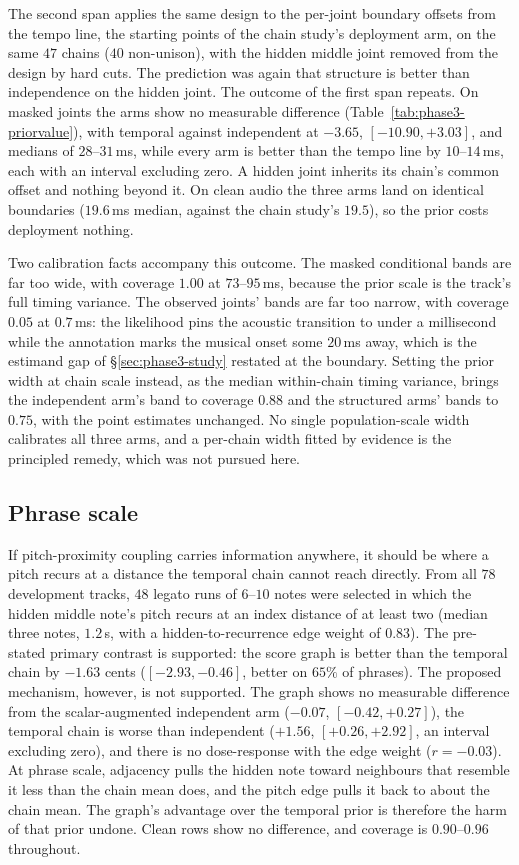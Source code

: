 The second span applies the same design to the per-joint boundary offsets
from the tempo line, the starting points of the chain study's deployment
arm, on the same $47$ chains ($40$ non-unison), with the hidden middle joint
removed from the design by hard cuts. The prediction was again that
structure is better than independence on the hidden joint. The outcome of
the first span repeats. On masked joints the arms show no measurable
difference (Table~\ref{tab:phase3-priorvalue}), with temporal against
independent at $-3.65$, $[-10.90, +3.03]$, and medians of $28$--$31$\,ms,
while every arm is better than the tempo line by $10$--$14$\,ms, each with
an interval excluding zero. A hidden joint inherits its chain's common
offset and nothing beyond it. On clean audio the three arms land on
identical boundaries ($19.6$\,ms median, against the chain study's $19.5$),
so the prior costs deployment nothing.

Two calibration facts accompany this outcome. The masked conditional bands
are far too wide, with coverage $1.00$ at $73$--$95$\,ms, because the prior
scale is the track's full timing variance. The observed joints' bands are
far too narrow, with coverage $0.05$ at $0.7$\,ms: the likelihood pins the
acoustic transition to under a millisecond while the annotation marks the
musical onset some $20$\,ms away, which is the estimand gap of
\S\ref{sec:phase3-study} restated at the boundary. Setting the prior width
at chain scale instead, as the median within-chain timing variance, brings
the independent arm's band to coverage $0.88$ and the structured arms'
bands to $0.75$, with the point estimates unchanged. No single
population-scale width calibrates all three arms, and a per-chain width
fitted by evidence is the principled remedy, which was not pursued here.

\subsection{Phrase scale}

If pitch-proximity coupling carries information anywhere, it should be
where a pitch recurs at a distance the temporal chain cannot reach
directly. From all $78$ development tracks, $48$ legato runs of $6$--$10$
notes were selected in which the hidden middle note's pitch recurs at an
index distance of at least two (median three notes, $1.2$\,s, with a
hidden-to-recurrence edge weight of $0.83$). The pre-stated primary
contrast is supported: the score graph is better than the temporal chain
by $-1.63$ cents ($[-2.93, -0.46]$, better on $65\%$ of phrases). The
proposed mechanism, however, is not supported. The graph shows no
measurable difference from the scalar-augmented independent arm ($-0.07$,
$[-0.42, +0.27]$), the temporal chain is worse than independent ($+1.56$,
$[+0.26, +2.92]$, an interval excluding zero), and there is no
dose-response with the edge weight ($r=-0.03$). At phrase scale, adjacency
pulls the hidden note toward neighbours that resemble it less than the
chain mean does, and the pitch edge pulls it back to about the chain mean.
The graph's advantage over the temporal prior is therefore the harm of that
prior undone. Clean rows show no difference, and coverage is
$0.90$--$0.96$ throughout.

